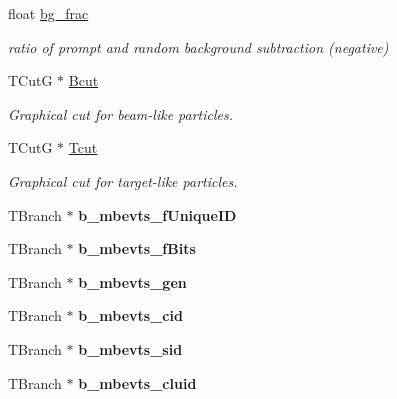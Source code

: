 \begin{DoxyCompactItemize}
float \hyperlink{classg__clx_ad9d34b2f15cdb59de8b46f1f68280c5c}{bg\+\_\+frac}
\begin{DoxyCompactList}\small\item\em ratio of prompt and random background subtraction (negative) \end{DoxyCompactList}\item 
\mbox{\label{classg__clx_aac4c4ec97958e7de623f4da6ce18e201}} 
T\+CutG $\ast$ \hyperlink{classg__clx_aac4c4ec97958e7de623f4da6ce18e201}{Bcut}
\begin{DoxyCompactList}\small\item\em Graphical cut for beam-\/like particles. \end{DoxyCompactList}\item 
\mbox{\label{classg__clx_adeec87c9054ed3ebe42cb6c563570e74}} 
T\+CutG $\ast$ \hyperlink{classg__clx_adeec87c9054ed3ebe42cb6c563570e74}{Tcut}
\begin{DoxyCompactList}\small\item\em Graphical cut for target-\/like particles. \end{DoxyCompactList}\item 
\mbox{\label{classg__clx_a1f538144f99e496310a1a9ae5e70105f}} 
T\+Branch $\ast$ {\bfseries b\+\_\+mbevts\+\_\+f\+Unique\+ID}
\item 
\mbox{\label{classg__clx_a139bfd9efe94ceb8342458f5bd3e030d}} 
T\+Branch $\ast$ {\bfseries b\+\_\+mbevts\+\_\+f\+Bits}
\item 
\mbox{\label{classg__clx_ab6c9d482753c7a505ae69b37b8c70a61}} 
T\+Branch $\ast$ {\bfseries b\+\_\+mbevts\+\_\+gen}
\item 
\mbox{\label{classg__clx_ad1aa921ec8371d9fd2470cc1a9166514}} 
T\+Branch $\ast$ {\bfseries b\+\_\+mbevts\+\_\+cid}
\item 
\mbox{\label{classg__clx_a652ba89f8955d64cb10019042407ed66}} 
T\+Branch $\ast$ {\bfseries b\+\_\+mbevts\+\_\+sid}
\item 
\mbox{\label{classg__clx_ad7e1bcca259dbdcee878142a0408c4f2}} 
T\+Branch $\ast$ {\bfseries b\+\_\+mbevts\+\_\+cluid}
\item 

\end{DoxyCompactItemize}
